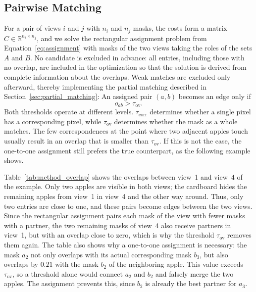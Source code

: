 \documentclass[english, egger, bsc]{vcethesis}
\begin{document}
\subsection{Pairwise Matching}
\label{sec:method_pairwise}
For a pair of views $i$ and $j$ with $n_i$ and $n_j$ masks, the costs form a matrix $C \in \mathbb{R}^{n_i \times n_j}$, and we solve the rectangular assignment problem from Equation~\eqref{eq:assignment} with masks of the two views taking the roles of the sets $A$ and $B$. No candidate is excluded in advance: all entries, including those with no overlap, are included in the optimization so that the solution is derived from complete information about the overlaps. Weak matches are excluded only afterward, thereby implementing the partial matching described in Section~\ref{sec:partial_matching}: An assigned pair $(a,b)$ becomes an edge only if 
\begin{equation}
    \label{eq:overlap_threshold}
    o_{ab} > \tau_{\mathrm{ov}}.
\end{equation}
Both thresholds operate at different levels. $\tau_{\mathrm{corr}}$ determines whether a single pixel has a corresponding pixel, while $\tau_{\mathrm{ov}}$ determines whether the mask as a whole matches. The few correspondences at the point where two adjacent apples touch usually result in an overlap that is smaller than $\tau_{\mathrm{ov}}$. If this is not the case, the one-to-one assignment still prefers the true counterpart, as the following example shows.

Table~\ref{tab:method_overlap} shows the overlaps between view~1 and view~4 of the example. Only two apples are visible in both views; the cardboard hides the remaining apples from view~1 in view~4 and the other way around. Thus, only two entries are close to one, and these pairs become edges between the two views. Since the rectangular assignment pairs each mask of the view with fewer masks with a partner, the two remaining masks of view~4 also receive partners in view~1, but with an overlap close to zero, which is why the threshold $\tau_{\mathrm{ov}}$ removes them again. The table also shows why a one-to-one assignment is necessary: the mask $a_2$ not only overlaps with its actual corresponding mask $b_3$, but also overlaps by $0.21$ with the mask $b_2$ of the neighboring apple. This value exceeds $\tau_{\mathrm{ov}}$, so a threshold alone would connect $a_2$ and $b_2$ and falsely merge the two apples. The assignment prevents this, since $b_2$ is already the best partner for $a_3$.
\begin{table}[tbp]
    \centering
    \caption{Overlap $o_{ab}$ between the masks $a$ of view~1 (rows) and the masks $b$ of view~4 (columns) of the running example. Bold: pairs accepted as edges; italic: pairs rejected by $\tau_{\mathrm{ov}} = 0.2$.}
    \label{tab:method_overlap}
    
\end{table}
\end{document}
